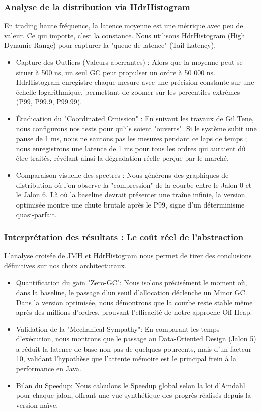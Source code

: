 \subsubsection{Analyse de la distribution via HdrHistogram}

En trading haute fréquence, la latence moyenne est une métrique avec peu de valeur. Ce qui importe, c'est la constance. Nous utilisons HdrHistogram (High Dynamic Range) pour capturer la "queue de latence" (Tail Latency).

\begin{itemize}
    \item Capture des Outliers (Valeurs aberrantes) : Alors que la moyenne peut se situer à 500 ns, un seul GC peut propulser un ordre à 50 000 ns. HdrHistogram enregistre chaque mesure avec une précision constante sur une échelle logarithmique, permettant de zoomer sur les percentiles extrêmes (P99, P99.9, P99.99).
    \item Éradication du "Coordinated Omission" : En suivant les travaux de Gil Tene, nous configurons nos tests pour qu'ils soient "ouverts". Si le système subit une pause de 1 ms, nous ne sautons pas les mesures pendant ce laps de temps ; nous enregistrons une latence de 1 ms pour tous les ordres qui auraient dû être traités, révélant ainsi la dégradation réelle perçue par le marché.
    \item Comparaison visuelle des spectres : Nous générons des graphiques de distribution où l'on observe la "compression" de la courbe entre le Jalon 0 et le Jalon 6. Là où la baseline devrait présenter une traîne infinie, la version optimisée montre une chute brutale après le P99, signe d'un déterminisme quasi-parfait.
\end{itemize}

\subsubsection{Interprétation des résultats : Le coût réel de l'abstraction}

L'analyse croisée de JMH et HdrHistogram nous permet de tirer des conclusions définitives sur nos choix architecturaux.

\begin{itemize}
    \item Quantification du gain "Zero-GC": Nous isolons précisément le moment où, dans la baseline, le passage d'un seuil d'allocation déclenche un Minor GC. Dans la version optimisée, nous démontrons que la courbe reste stable même après des millions d'ordres, prouvant l'efficacité de notre approche Off-Heap.
    \item Validation de la "Mechanical Sympathy": En comparant les temps d'exécution, nous montrons que le passage au Data-Oriented Design (Jalon 5) a réduit la latence de base non pas de quelques pourcents, mais d'un facteur 10, validant l'hypothèse que l'attente mémoire est le principal frein à la performance en Java.
    \item Bilan du Speedup: Nous calculons le Speedup global selon la loi d'Amdahl pour chaque jalon, offrant une vue synthétique des progrès réalisés depuis la version naïve.
\end{itemize}

